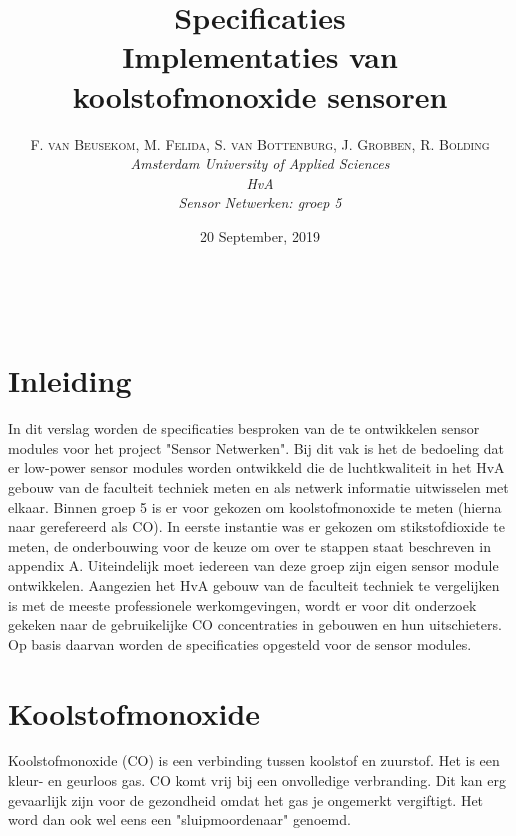 \documentclass[a4paper, 11pt]{article} %
\title{\textbf{Specificaties}\\ %
Implementaties van koolstofmonoxide sensoren} %
\author{\textsc{F. van Beusekom, M. Felida, S. van Bottenburg, J. Grobben, R. Bolding} %
\\{\textit{Amsterdam University of Applied Sciences\\ 
HvA\\
Sensor Netwerken: groep 5}}} %
\date{20 September, 2019} %
\makeatletter
\renewcommand{\maketitle}{ %
\begin{flushright} %
{\LARGE\@title} %

\vspace{50pt} %

{\large\@author} %
\\\@date %

\vspace{40pt} %
\end{flushright}
}
\makeatother
\begin{document}
\captionsetup{justification=centering}
\hypersetup{hidelinks=true}
\maketitle %




\vspace{10pt} %

\newpage
\section{Inleiding}
In dit verslag worden de specificaties besproken van de te ontwikkelen sensor modules voor het project "Sensor Netwerken". Bij dit vak is het de bedoeling dat er low-power sensor modules worden ontwikkeld die de luchtkwaliteit in het HvA gebouw van de faculteit techniek meten en als netwerk informatie uitwisselen met elkaar. Binnen groep 5 is er voor gekozen om koolstofmonoxide te meten (hierna naar gerefereerd als CO). In eerste instantie was er gekozen om stikstofdioxide te meten, de onderbouwing voor de keuze om over te stappen staat beschreven in appendix A. Uiteindelijk moet iedereen van deze groep zijn eigen sensor module ontwikkelen. Aangezien het HvA gebouw van de faculteit techniek te vergelijken is met de meeste professionele werkomgevingen, wordt er voor dit onderzoek gekeken naar de gebruikelijke CO concentraties in gebouwen en hun uitschieters. Op basis daarvan worden de specificaties opgesteld voor de sensor modules.

\section{Koolstofmonoxide}
Koolstofmonoxide (CO) is een verbinding tussen koolstof en zuurstof. Het is een kleur- en geurloos gas. CO komt vrij bij een onvolledige verbranding. Dit kan erg gevaarlijk zijn voor de gezondheid omdat het gas je ongemerkt vergiftigt. Het word dan ook wel eens een "sluipmoordenaar" genoemd. 
\end{document}
